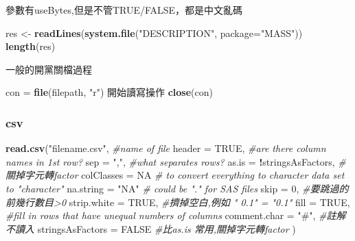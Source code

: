 \documentclass[]{book}
\newenvironment{Shaded}{\begin{snugshade}}{\end{snugshade}}
\newcommand{\KeywordTok}[1]{\textcolor[rgb]{0.13,0.29,0.53}{\textbf{#1}}}
\newcommand{\DataTypeTok}[1]{\textcolor[rgb]{0.13,0.29,0.53}{#1}}
\newcommand{\DecValTok}[1]{\textcolor[rgb]{0.00,0.00,0.81}{#1}}
\newcommand{\StringTok}[1]{\textcolor[rgb]{0.31,0.60,0.02}{#1}}
\newcommand{\CommentTok}[1]{\textcolor[rgb]{0.56,0.35,0.01}{\textit{#1}}}
\newcommand{\OtherTok}[1]{\textcolor[rgb]{0.56,0.35,0.01}{#1}}
\newcommand{\OperatorTok}[1]{\textcolor[rgb]{0.81,0.36,0.00}{\textbf{#1}}}
\newcommand{\NormalTok}[1]{#1}
\theoremstyle{definition}
\theoremstyle{definition}
\theoremstyle{definition}
\theoremstyle{remark}
\begin{document}
參數有useBytes,但是不管TRUE/FALSE，都是中文亂碼

\begin{Shaded}
\begin{Highlighting}[]
\NormalTok{res <-}\StringTok{ }\KeywordTok{readLines}\NormalTok{(}\KeywordTok{system.file}\NormalTok{(}\StringTok{"DESCRIPTION"}\NormalTok{, }\DataTypeTok{package=}\StringTok{"MASS"}\NormalTok{))}
\KeywordTok{length}\NormalTok{(res)}
\end{Highlighting}
\end{Shaded}

一般的開黨關檔過程

\begin{Shaded}
\begin{Highlighting}[]
\NormalTok{  con =}\StringTok{ }\KeywordTok{file}\NormalTok{(filepath, }\StringTok{"r"}\NormalTok{)}
\NormalTok{  開始讀寫操作}
  \KeywordTok{close}\NormalTok{(con)}
\end{Highlighting}
\end{Shaded}

\subsubsection{csv}\label{csv}

\begin{Shaded}
\begin{Highlighting}[]
\KeywordTok{read.csv}\NormalTok{(}\StringTok{"filename.csv"}\NormalTok{, }\CommentTok{#name of file}
         \DataTypeTok{header =} \OtherTok{TRUE}\NormalTok{, }\CommentTok{#are there column names in 1st row?}
         \DataTypeTok{sep =} \StringTok{","}\NormalTok{, }\CommentTok{#what separates rows?}
         \DataTypeTok{as.is =} \OperatorTok{!}\NormalTok{stringsAsFactors, }\CommentTok{#關掉字元轉factor}
         \DataTypeTok{colClasses =} \OtherTok{NA} \CommentTok{# to convert everything to character data set to "character"}
         \DataTypeTok{na.string =} \StringTok{"NA"} \CommentTok{# could be "." for SAS files}
         \DataTypeTok{skip =} \DecValTok{0}\NormalTok{, }\CommentTok{#要跳過的前幾行數目>0}
         \DataTypeTok{strip.white =} \OtherTok{TRUE}\NormalTok{, }\CommentTok{#擠掉空白,例如 " 0.1" = "0.1"}
         \DataTypeTok{fill =} \OtherTok{TRUE}\NormalTok{, }\CommentTok{#fill in rows that have unequal numbers of columns}
         \DataTypeTok{comment.char =} \StringTok{"#"}\NormalTok{, }\CommentTok{#註解不讀入}
         \DataTypeTok{stringsAsFactors =} \OtherTok{FALSE} \CommentTok{#比as.is 常用,關掉字元轉factor}
\NormalTok{         )}
\end{Highlighting}
\end{Shaded}
\end{document}
